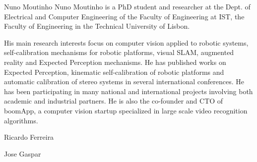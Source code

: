 \begin{IEEEbiography}{Nuno Moutinho}
Nuno Moutinho is a PhD student and researcher at the Dept. of Electrical and Computer Engineering of the Faculty of Engineering at IST, the Faculty of Engineering in the Technical University of Lisbon.

His main research interests focus on computer vision applied to robotic systems, self-calibration mechanisms for robotic platforms, visual SLAM, augmented reality and Expected Perception mechanisms. He has published works on Expected Perception, kinematic self-calibration of robotic platforms and automatic calibration of stereo systems in several international conferences. He has been participating in many national and international projects involving both academic and industrial partners. He is also the co-founder and CTO of boomApp, a computer vision startup specialized in large scale video recognition algorithms.
\end{IEEEbiography}

\begin{IEEEbiography}{Ricardo Ferreira}
\end{IEEEbiography}

\begin{IEEEbiography}{Jose Gaspar}
\end{IEEEbiography}

